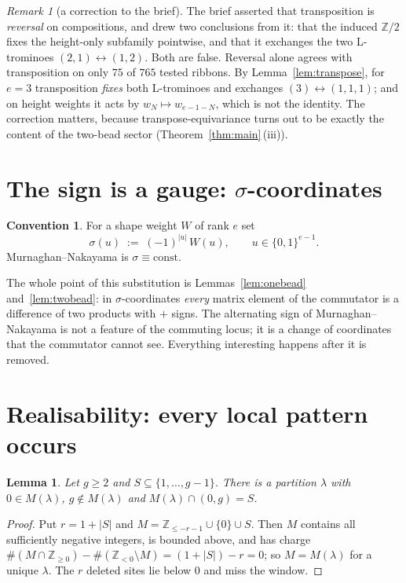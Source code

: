 \documentclass[11pt]{article}
\newtheorem{lemma}[theorem]{Lemma}
\theoremstyle{definition}
\newtheorem{convention}[theorem]{Convention}
\theoremstyle{remark}
\newtheorem{remark}[theorem]{Remark}
\newcommand{\Z}{\mathbb{Z}}
\begin{document}
\begin{remark}[a correction to the brief]\label{rem:briefwrong}
The brief asserted that transposition is \emph{reversal} on compositions, and drew two
conclusions from it: that the induced $\Z/2$ fixes the height-only subfamily pointwise,
and that it exchanges the two L-trominoes $(2,1)\leftrightarrow(1,2)$.  Both are false.
Reversal alone agrees with transposition on only $75$ of $765$ tested ribbons.  By
Lemma~\ref{lem:transpose}, for $e=3$ transposition \emph{fixes} both L-trominoes and
exchanges $(3)\leftrightarrow(1,1,1)$; and on height weights it acts by
$w_N\mapsto w_{e-1-N}$, which is not the identity.  The correction matters, because
transpose-equivariance turns out to be exactly the content of the two-bead sector
(Theorem~\ref{thm:main}\,(iii)).
\end{remark}

\section{The sign is a gauge: $\sigma$-coordinates}\label{sec:sigma}

\begin{convention}\label{conv:sigma}
For a shape weight $W$ of rank $e$ set
\[
   \sigma(u) \;:=\; (-1)^{|u|}\,W(u),\qquad u\in\{0,1\}^{e-1}.
\]
Murnaghan--Nakayama is $\sigma\equiv\text{const}$.
\end{convention}

The whole point of this substitution is Lemmas~\ref{lem:onebead} and~\ref{lem:twobead}:
in $\sigma$-coordinates \emph{every} matrix element of the commutator is a difference of
two products with $+$ signs.  The alternating sign of Murnaghan--Nakayama is not a
feature of the commuting locus; it is a change of coordinates that the commutator cannot
see.  Everything interesting happens after it is removed.

\section{Realisability: every local pattern occurs}

\begin{lemma}\label{lem:realise}
Let $g\ge2$ and $S\subseteq\{1,\dots,g-1\}$.  There is a partition $\lambda$ with
$0\in M(\lambda)$, $g\notin M(\lambda)$ and $M(\lambda)\cap(0,g)=S$.
\end{lemma}

\begin{proof}
Put $r=1+|S|$ and $M=\Z_{\le-r-1}\cup\{0\}\cup S$.  Then $M$ contains all sufficiently
negative integers, is bounded above, and has charge
$\#(M\cap\Z_{\ge0})-\#(\Z_{<0}\setminus M)=(1+|S|)-r=0$; so $M=M(\lambda)$ for a unique
$\lambda$.  The $r$ deleted sites lie below $0$ and miss the window.
\end{proof}
\end{document}
